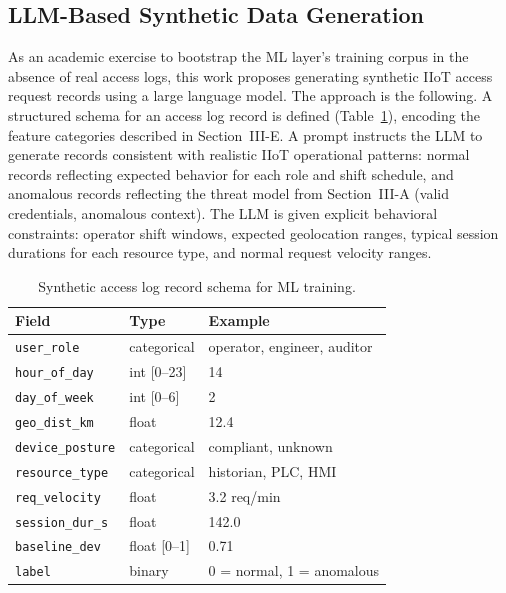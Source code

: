 \documentclass[conference]{IEEEtran}
\begin{document}
\subsection{LLM-Based Synthetic Data Generation}

As an academic exercise to bootstrap the ML layer's training corpus in the absence of real access logs, this work proposes generating synthetic IIoT access request records using a large language model. The approach is the following. A structured schema for an access log record is defined (Table~\ref{tab:schema}), encoding the feature categories described in Section~III-E. A prompt instructs the LLM to generate records consistent with realistic IIoT operational patterns: normal records reflecting expected behavior for each role and shift schedule, and anomalous records reflecting the threat model from Section~III-A (valid credentials, anomalous context). The LLM is given explicit behavioral constraints: operator shift windows, expected geolocation ranges, typical session durations for each resource type, and normal request velocity ranges.

\begin{table}[t]
\centering
\caption{Synthetic access log record schema for ML training.}
\label{tab:schema}
\begin{tabular}{p{2.4cm}p{1.6cm}p{2.8cm}}
\toprule
\textbf{Field} & \textbf{Type} & \textbf{Example} \\
\midrule
\texttt{user\_role} & categorical & operator, engineer, auditor \\
\addlinespace
\texttt{hour\_of\_day} & int [0--23] & 14 \\
\addlinespace
\texttt{day\_of\_week} & int [0--6] & 2 \\
\addlinespace
\texttt{geo\_dist\_km} & float & 12.4 \\
\addlinespace
\texttt{device\_posture} & categorical & compliant, unknown \\
\addlinespace
\texttt{resource\_type} & categorical & historian, PLC, HMI \\
\addlinespace
\texttt{req\_velocity} & float & 3.2 req/min \\
\addlinespace
\texttt{session\_dur\_s} & float & 142.0 \\
\addlinespace
\texttt{baseline\_dev} & float [0--1] & 0.71 \\
\addlinespace
\texttt{label} & binary & 0 = normal, 1 = anomalous \\
\bottomrule
\end{tabular}
\end{table}
\end{document}
